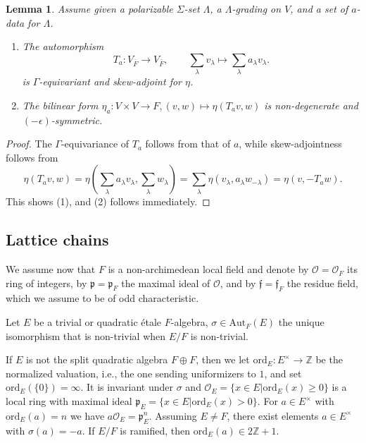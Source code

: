 \documentclass{article}
\def\mf#1{\mathfrak{#1}}
\def\tx#1{\textrm{#1}}
\def\Z{\mathbb{Z}}
\def\cO{\mathcal{O}}
\newtheorem{lem}[thm]{Lemma}
\theoremstyle{definition}
\numberwithin{equation}{subsection}
\renewcommand{\-}{\hyp{}}
\newcommand{\rf}{\mathfrak{f}}
\begin{document}
\begin{lem} \label{lem:askew}
	Assume given a polarizable $\Sigma$-set $\Lambda$, a $\Lambda$-grading on $V$, and a set of $a$-data for $\Lambda$. 
	\begin{enumerate}
		\item The automorphism
	\[ T_a : V_{\bar F} \to V_{\bar F},\qquad \sum_\lambda v_\lambda \mapsto \sum_\lambda a_\lambda v_\lambda. \]
	is $\Gamma$-equivariant and skew-adjoint for $\eta$.
	\item The bilinear form $\eta_a : V \times V \to F, (v,w) \mapsto \eta(T_av,w)$ is non-degenerate and $(-\epsilon)$-symmetric.
	\end{enumerate}
\end{lem}
\begin{proof}
	The $\Gamma$-equivariance of $T_a$ follows from that of $a$, while skew-adjointness follows from 
	\[ \eta(T_av,w) = \eta(\sum_\lambda a_\lambda v_\lambda,\sum_\lambda w_\lambda)  =  \sum_\lambda \eta(v_\lambda,a_\lambda w_{-\lambda}) =\eta(v,-T_aw).  \]
	This shows (1), and (2) follows immediately.
\end{proof}




\subsection{Lattice chains} \label{sub:lattice}

We assume now that $F$ is a non-archimedean local field and denote by $\cO=\cO_F$ its ring of integers, by $\mf{p}=\mf{p}_F$ the maximal ideal of $\cO$, and by $\rf=\rf_F$ the residue field, which we assume to be of odd characteristic.

Let $E$ be a trivial or quadratic \'etale $F$-algebra, $\sigma \in \tx{Aut}_F(E)$ the unique isomorphism that is non-trivial when $E/F$ is non-trivial.

If $E$ is not the split quadratic algebra $F \oplus F$, then we let $\tx{ord}_E : E^\times \to \Z$ be the normalized valuation, i.e., the one sending uniformizers to $1$, and set $\tx{ord}_E(\{0\})=\infty$. It is invariant under $\sigma$ and $\cO_E=\{x \in E|\tx{ord}_E(x)\geq 0\}$ is a local ring with maximal ideal $\mf{p}_E = \{x \in E|\tx{ord}_E(x)>0\}$. For $a \in E^\times$ with $\tx{ord}_E(a)=n$ we have $a\cO_E = \mf{p}_E^n$. Assuming $E \neq F$, there exist elements $a \in E^\times$ with $\sigma(a)=-a$. If $E/F$ is ramified, then $\tx{ord}_E(a) \in 2\Z+1$.
\end{document}
